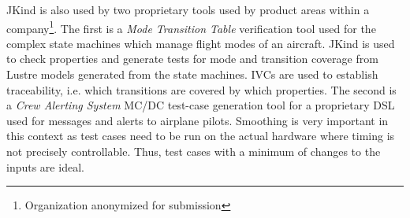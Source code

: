 \documentclass{llncs}
\newcommand{\jkind}{{\sc JKind}\xspace}
\newcommand{\lustre}{{\sc Lustre}\xspace}
\renewcommand{\paragraph}[1]{\vspace{5pt}\noindent {\bf #1}}
\newcommand{\application}[2]{
  \paragraph{#1} \hfill {\it #2}
  \vspace{1pt}
}
\begin{document}
\jkind is also used by two proprietary tools used by product areas within a company\footnote{Organization anonymized for submission}.  The first is a {\em Mode Transition Table} verification tool used for the complex state machines which manage flight modes of an aircraft.
\jkind is used to check properties and generate tests for mode and transition coverage from \lustre models generated from the state machines.
IVCs are used to establish traceability, i.e. which transitions are covered by which properties.  The second is a {\em Crew Alerting System} MC/DC test-case generation tool for a proprietary DSL used for messages and alerts to airplane pilots.  Smoothing is very important in this context as test cases need to be run on the actual hardware where
timing is not precisely controllable. Thus, test cases with a minimum
of changes to the inputs are ideal.
%
%




\end{document}
